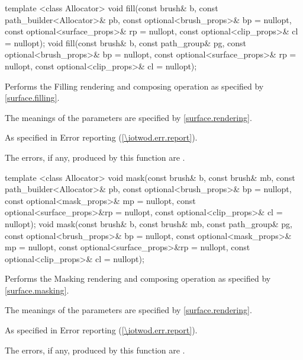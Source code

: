 \begin{itemdecl}
template <class Allocator>
void fill(const brush& b, const path_builder<Allocator>& pb,
  const optional<brush_props>& bp = nullopt,
  const optional<surface_props>& rp = nullopt,
  const optional<clip_props>& cl = nullopt);
void fill(const brush& b, const path_group& pg,
  const optional<brush_props>& bp = nullopt,
  const optional<surface_props>& rp = nullopt,
  const optional<clip_props>& cl = nullopt);
\end{itemdecl}
\begin{itemdescr}
\pnum
\effects
Performs the Filling rendering and composing operation as specified by \ref{surface.filling}.

\pnum
The meanings of the parameters are specified by \ref{surface.rendering}.

\pnum
\throws
As specified in Error reporting (\ref{\iotwod.err.report}).

\pnum
\errors
The errors, if any, produced by this function are .
\end{itemdescr}

\begin{itemdecl}
template <class Allocator>
void mask(const brush& b, const brush& mb,
  const path_builder<Allocator>& pb,
  const optional<brush_props>& bp = nullopt,
  const optional<mask_props>& mp = nullopt,
  const optional<surface_props>&rp = nullopt,
  const optional<clip_props>& cl = nullopt);
void mask(const brush& b, const brush& mb, const path_group& pg,
  const optional<brush_props>& bp = nullopt,
  const optional<mask_props>& mp = nullopt,
  const optional<surface_props>&rp = nullopt,
  const optional<clip_props>& cl = nullopt);
\end{itemdecl}
\begin{itemdescr}
\pnum
\effects
Performs the Masking rendering and composing operation as specified by \ref{surface.masking}.

\pnum
The meanings of the parameters are specified by \ref{surface.rendering}.

\pnum
\throws
As specified in Error reporting (\ref{\iotwod.err.report}).

\pnum
\errors

The errors, if any, produced by this function are .
\end{itemdescr}
